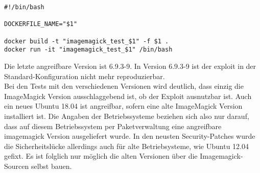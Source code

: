 \begin{lstlisting}[language=Text, caption=Script debug.sh in Testsuite,label={lst:testsuitedebugcall}]
#!/bin/bash

DOCKERFILE_NAME="$1"

docker build -t "imagemagick_test_$1" -f $1 .
docker run -it "imagemagick_test_$1" /bin/bash
\end{lstlisting}
\vspace{5mm}


Die letzte angreifbare Version ist 6.9.3-9.
In Version 6.9.3-9 ist der exploit in der Standard-Konfiguration nicht mehr reproduzierbar.\\

Bei den Tests mit den verschiedenen Versionen wird deutlich, dass einzig die ImageMagick Version ausschlaggebend ist,
ob der Exploit ausnutzbar ist.
Auch ein neues Ubuntu 18.04 ist angreifbar, sofern eine alte ImageMagick Version installiert ist.
Die Angaben der Betriebssysteme beziehen sich also nur darauf,
dass auf diesem Betriebssystem per Paketverwaltung eine angreifbare imagemagick Version ausgeliefert wurde.
In den neusten Security-Patches wurde die Sicherheitslücke allerdings auch für alte Betriebsysteme, wie Ubuntu 12.04 gefixt.
Es ist folglich nur möglich die alten Versionen über die Imagemagick-Sourcen selbst bauen.